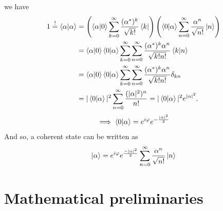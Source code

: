 \documentclass[12pt, a4paper,  nobibnotes]{article}
\begin{document}
we have 
\begin{align*}
    1\overset{!}{=} \braket{\alpha|\alpha} & = 
    \left(\braket{\alpha|0}\sum\limits_{k=0}^{\infty}\frac{(\alpha^*)^k}{\sqrt{k!}}\bra k\right)
    \left(\braket{0|\alpha}\sum\limits_{n=0}^{\infty}\frac{\alpha^n}{\sqrt{n!}}\ket n\right)\\
    &=\braket{\alpha|0}\braket{0|\alpha}\sum\limits_{k=0}^{\infty} \sum\limits_{n=0}^{\infty}
    \frac{(\alpha^*)^k\alpha^n}{\sqrt{k!n!}}\braket{k|n} \\
    &=\braket{\alpha|0}\braket{0|\alpha}\sum\limits_{k=0}^{\infty} \sum\limits_{n=0}^{\infty}
    \frac{(\alpha^*)^k\alpha^n}{\sqrt{k!n!}}\delta_{kn}\\
    &= |\braket{0|\alpha}|^2 \sum\limits_{n=0}^{\infty} \frac{(|\alpha|^2)^n}{n!} = |\braket{0|\alpha}|^2e^{|\alpha|^2}.
\end{align*}
\begin{equation*}
    \implies \braket{0|\alpha} = e^{i\varphi}e^{-\frac{|\alpha|^2}{2}}
\end{equation*}
And so, a coherent state can be written as 
\begin{equation*}
    \ket\alpha = e^{i\varphi}e^{\frac{-|\alpha|^2}{2}}\sum\limits_{n=0}^{\infty}\frac{\alpha^n}{\sqrt{n!}}\ket n
\end{equation*}
\section{Mathematical preliminaries}
\end{document}
